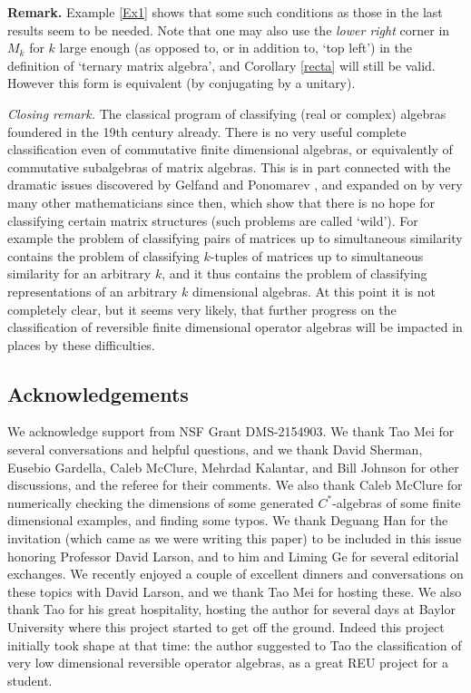 \documentclass{amsart}
\theoremstyle{remark}
\theoremstyle{definition}
\numberwithin{equation}{section}
\begin{document}
{\bf Remark.} Example \ref{Ex1} shows that some such conditions as those in the last results seem to be needed.  Note that one may also use the {\em lower right} corner in $M_k$ for $k$ large enough (as opposed to, or in addition to,
 `top left') in the definition of `ternary matrix algebra', and Corollary  \ref{recta} will still be valid.
 However this form  is equivalent (by conjugating by a unitary). 
 
\bigskip
 
 {\em Closing remark.}  The classical program of classifying 
 (real or complex) algebras foundered in the 19th century already.   There is no very useful complete 
classification  even of commutative finite dimensional algebras, or equivalently of 
commutative  subalgebras of matrix algebras. 
This is in part connected with the dramatic issues discovered by Gelfand and Ponomarev
\cite{GP}, and expanded on by very many other mathematicians since then, which show that there is no hope 
for classifying certain matrix structures (such problems are called `wild').   
For example the problem of classifying pairs of matrices up to simultaneous similarity contains the problem of classifying $k$-tuples of matrices up to simultaneous similarity for an arbitrary $k$, and it thus contains the problem of classifying representations of an arbitrary $k$ dimensional algebras.  At this point it is not completely clear, but it seems very likely,  that further progress on the classification of reversible finite dimensional operator algebras will be impacted in places by these difficulties. 
  
 


 \subsection*{Acknowledgements}   
 We acknowledge support from NSF Grant DMS-2154903.  We thank Tao Mei for several conversations and helpful questions, and we thank David Sherman, Eusebio Gardella, Caleb McClure, Mehrdad Kalantar, and Bill Johnson  for other discussions, and the referee for their comments.  We also thank Caleb McClure for  numerically checking the dimensions of some generated $C^*$-algebras of some finite dimensional examples, and finding some typos.    We thank Deguang Han for the invitation (which came as we were writing this paper) to be included in this issue honoring Professor David Larson, and to him and Liming Ge for several editorial exchanges. We recently enjoyed a couple of excellent dinners and conversations on these topics with David Larson, and we thank Tao Mei for hosting these.  We also thank Tao  for his great hospitality, hosting the author for several days at Baylor University where this project started to get off the ground.      Indeed this project initially took shape at that time: the author suggested to Tao the classification of very low dimensional reversible operator algebras, as a great REU project for a student.   
\end{document}
